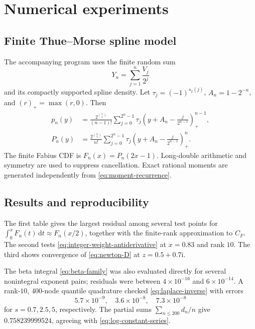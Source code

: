 \documentclass[11pt,oneside]{article}
\theoremstyle{definition}
\theoremstyle{remark}
\newcommand{\ii}{\mathrm i}
\newcommand{\dd}{\,\mathrm d}
\begin{document}
\section{Numerical experiments}

\subsection{Finite Thue--Morse spline model}

The accompanying program uses the finite random sum
\begin{equation}
 Y_n=\sum_{j=1}^n\frac{V_j}{2^j}
\end{equation}
and its compactly supported spline density.  Let
$\tau_j=(-1)^{s_2(j)}$, $A_n=1-2^{-n}$, and $(r)_+=\max(r,0)$.  Then
\begin{align}
 p_n(y)&=\frac{2^{\binom n2}}{(n-1)!}
 \sum_{j=0}^{2^n-1}\tau_j
 \left(y+A_n-\frac{j}{2^{n-1}}\right)_+^{n-1},\label{eq:finite-density}\\
 P_n(y)&=\frac{2^{\binom n2}}{n!}
 \sum_{j=0}^{2^n-1}\tau_j
 \left(y+A_n-\frac{j}{2^{n-1}}\right)_+^{n}.
 \label{eq:finite-cdf}
\end{align}
The finite Fabius CDF is $F_n(x)=P_n(2x-1)$.  Long-double arithmetic and symmetry are used to suppress cancellation.  Exact rational moments are generated independently from \eqref{eq:moment-recurrence}.

\subsection{Results and reproducibility}

The first table gives the largest residual among several test points for
$\int_0^xF_n(t)\dd t\approx F_n(x/2)$, together with the finite-rank approximation to $C_F$.  The second tests \eqref{eq:integer-weight-antiderivative} at $x=0.83$ and rank $10$.  The third shows convergence of \eqref{eq:newton-D} at $z=0.5+0.7\ii$.

\begin{center}

\end{center}

The beta integral \eqref{eq:beta-family} was also evaluated directly for several nonintegral exponent pairs; residuals were between $4\times10^{-16}$ and $6\times10^{-14}$.  A rank-$10$, 400-node quantile quadrature checked \eqref{eq:laplace-inverse} with errors
\begin{equation}
 5.7\times10^{-9},\quad3.6\times10^{-8},\quad7.3\times10^{-8}
\end{equation}
for $s=0.7,2.5,5$, respectively.  The partial sums
$\sum_{n\le200}d_n/n$ give $0.758239999524$, agreeing with \eqref{eq:log-constant-series}.
\end{document}
